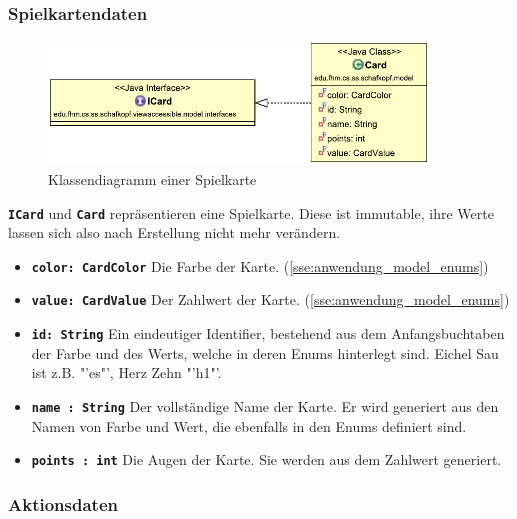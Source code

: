 \documentclass[
							a4paper, 
							11pt, 
							openany, 
							liststotoc,
							parskip=half, 
   							headings=normal
						]{scrreprt}
\begin{document}
{\clearpage

\subsubsection{Spielkartendaten} \label{ssse:anwendung_model_card}

\begin{figure}[H]
\begin{center}
    \includegraphics[width=0.9\textwidth]{./pictures/uml/class_diagram/uml_class_card.pdf}
	\caption[Anwendung/Model -- Klassendiagramm Spielkartendaten]{Klassendiagramm einer Spielkarte} \label{fig:model_card}
\end{center}
\end{figure}

\textbf{\texttt{ICard}} und \textbf{\texttt{Card}} repräsentieren eine Spielkarte. Diese ist immutable, ihre Werte lassen sich also nach Erstellung nicht mehr verändern.
\begin{itemize}
	\item \textbf{\texttt{color: CardColor}} Die Farbe der Karte. (\autoref{sse:anwendung_model_enums})
	\item \textbf{\texttt{value: CardValue}} Der Zahlwert der Karte. (\autoref{sse:anwendung_model_enums})
	\item \textbf{\texttt{id: String}} Ein eindeutiger Identifier, bestehend aus dem Anfangsbuchtaben der Farbe und des Werts, welche in deren Enums hinterlegt sind. Eichel Sau ist z.B. "'es"', Herz Zehn "'h1"'.
	\item \textbf{\texttt{name : String}} Der vollständige Name der Karte. Er wird generiert aus den Namen von Farbe und Wert, die ebenfalls in den Enums definiert sind.
	\item \textbf{\texttt{points : int}} Die Augen der Karte. Sie werden aus dem Zahlwert generiert.
\end{itemize}

\clearpage

\subsubsection{Aktionsdaten} \label{ssse:anwendung_model_actions}

}
\end{document}
